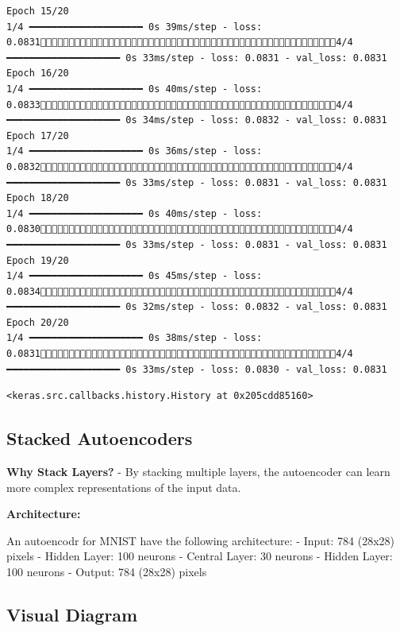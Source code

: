 \documentclass[
  letterpaper,
  DIV=11,
  numbers=noendperiod]{scrreprt}
\begin{document}
\begin{verbatim}
Epoch 15/20
1/4 ━━━━━━━━━━━━━━━━━━━━ 0s 39ms/step - loss: 0.08314/4 ━━━━━━━━━━━━━━━━━━━━ 0s 33ms/step - loss: 0.0831 - val_loss: 0.0831
Epoch 16/20
1/4 ━━━━━━━━━━━━━━━━━━━━ 0s 40ms/step - loss: 0.08334/4 ━━━━━━━━━━━━━━━━━━━━ 0s 34ms/step - loss: 0.0832 - val_loss: 0.0831
Epoch 17/20
1/4 ━━━━━━━━━━━━━━━━━━━━ 0s 36ms/step - loss: 0.08324/4 ━━━━━━━━━━━━━━━━━━━━ 0s 33ms/step - loss: 0.0831 - val_loss: 0.0831
Epoch 18/20
1/4 ━━━━━━━━━━━━━━━━━━━━ 0s 40ms/step - loss: 0.08304/4 ━━━━━━━━━━━━━━━━━━━━ 0s 33ms/step - loss: 0.0831 - val_loss: 0.0831
Epoch 19/20
1/4 ━━━━━━━━━━━━━━━━━━━━ 0s 45ms/step - loss: 0.08344/4 ━━━━━━━━━━━━━━━━━━━━ 0s 32ms/step - loss: 0.0832 - val_loss: 0.0831
Epoch 20/20
1/4 ━━━━━━━━━━━━━━━━━━━━ 0s 38ms/step - loss: 0.08314/4 ━━━━━━━━━━━━━━━━━━━━ 0s 33ms/step - loss: 0.0830 - val_loss: 0.0831
\end{verbatim}

\begin{verbatim}
<keras.src.callbacks.history.History at 0x205cdd85160>
\end{verbatim}

\subsection{Stacked Autoencoders}\label{stacked-autoencoders}

\textbf{Why Stack Layers?} - By stacking multiple layers, the
autoencoder can learn more complex representations of the input data.

\textbf{Architecture:}

An autoencodr for MNIST have the following architecture: - Input: 784
(28x28) pixels - Hidden Layer: 100 neurons - Central Layer: 30 neurons -
Hidden Layer: 100 neurons - Output: 784 (28x28) pixels

\subsection{Visual Diagram}\label{visual-diagram-4}
\end{document}
